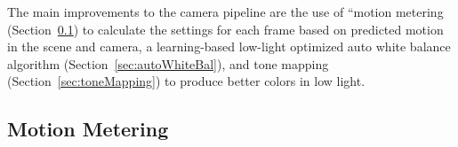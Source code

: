 \documentclass{sig-alternate}
\begin{document}
The main improvements to the camera pipeline are the use of ``motion metering (Section~\ref{sec:motionMetering}) to calculate the settings for each frame based on predicted motion in the scene and camera, a learning-based low-light optimized auto white balance algorithm (Section~\ref{sec:autoWhiteBal}), and tone mapping (Section~\ref{sec:toneMapping}) to produce better colors in low light.



\subsection{Motion Metering}
\label{sec:motionMetering}
\end{document}
